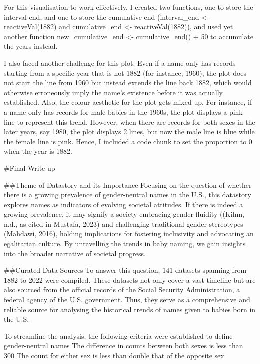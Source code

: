 \documentclass[
]{article}
\begin{document}
For this visualisation to work effectively, I created two functions, one
to store the interval end, and one to store the cumulative end
(interval\_end \textless- reactiveVal(1882) and cumulative\_end
\textless- reactiveVal(1882)), and used yet another function
new\_cumulative\_end \textless- cumulative\_end() + 50 to accumulate the
years instead.

I also faced another challenge for this plot. Even if a name only has
records starting from a specific year that is not 1882 (for instance,
1960), the plot does not start the line from 1960 but instead extends
the line back 1882, which would otherwise erroneously imply the name's
existence before it was actually established. Also, the colour aesthetic
for the plot gets mixed up. For instance, if a name only has records for
male babies in the 1960s, the plot displays a pink line to represent
this trend. However, when there are records for both sexes in the later
years, say 1980, the plot displays 2 lines, but now the male line is
blue while the female line is pink. Hence, I included a code chunk to
set the proportion to 0 when the year is 1882.

\#Final Write-up

\#\#Theme of Datastory and its Importance Focusing on the question of
whether there is a growing prevalence of gender-neutral names in the
U.S., this datastory explores names as indicators of evolving societal
attitudes. If there is indeed a growing prevalence, it may signify a
society embracing gender fluidity ((Kihm, n.d., as cited in Mustafa,
2023) and challenging traditional gender stereotypes (Mahdawi, 2016),
holding implications for fostering inclusivity and advocating an
egalitarian culture. By unravelling the trends in baby naming, we gain
insights into the broader narrative of societal progress.

\#\#Curated Data Sources To answer this question, 141 datasets spanning
from 1882 to 2022 were compiled. These datasets not only cover a vast
timeline but are also sourced from the official records of the Social
Security Administration, a federal agency of the U.S. government. Thus,
they serve as a comprehensive and reliable source for analysing the
historical trends of names given to babies born in the U.S.

To streamline the analysis, the following criteria were established to
define gender-neutral names The difference in counts between both sexes
is less than 300 The count for either sex is less than double that of
the opposite sex
\end{document}
